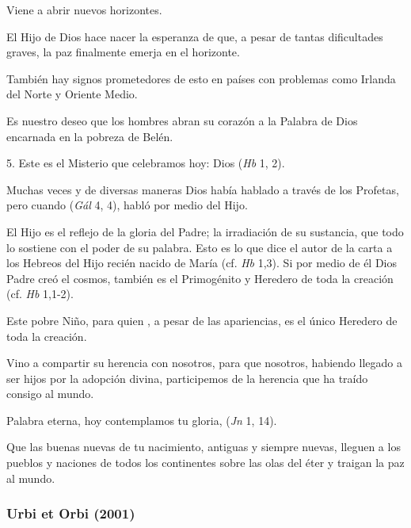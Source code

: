\begin{body}
	Viene a abrir nuevos horizontes.
	
	El Hijo de Dios hace nacer la esperanza de que, a pesar de tantas dificultades graves, la paz finalmente emerja en el horizonte.
	
	También hay signos prometedores de esto en países con problemas como Irlanda del Norte y Oriente Medio.
	
	Es nuestro deseo que los hombres abran su corazón a la Palabra de Dios encarnada en la pobreza de Belén.
	
	5. Este es el Misterio que celebramos hoy: Dios  (\emph{Hb} 1, 2).
	
	Muchas veces y de diversas maneras Dios había hablado a través de los Profetas, pero cuando  (\emph{Gál} 4, 4), habló por medio del Hijo.
	
	El Hijo es el reflejo de la gloria del Padre; la irradiación de su sustancia, que todo lo sostiene con el poder de su palabra. Esto es lo que dice el autor de la carta a los Hebreos del Hijo recién nacido de María (cf. \emph{Hb} 1,3). Si por medio de él Dios Padre creó el cosmos, también es el Primogénito y Heredero de toda la creación (cf. \emph{Hb} 1,1-2).
	
	Este pobre Niño, para quien , a pesar de las apariencias, es el único Heredero de toda la creación.
	
	Vino a compartir su herencia con nosotros, para que nosotros, habiendo llegado a ser hijos por la adopción divina, participemos de la herencia que ha traído consigo al mundo.
	
	Palabra eterna, hoy contemplamos tu gloria,  (\emph{Jn} 1, 14).
	
	Que las buenas nuevas de tu nacimiento, antiguas y siempre nuevas, lleguen a los pueblos y naciones de todos los continentes sobre las olas del éter y traigan la paz al mundo.
\end{body}


\subsubsection{Urbi et Orbi (2001)} 

